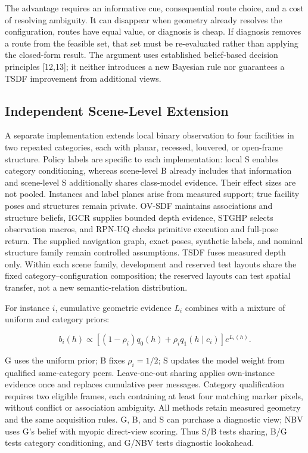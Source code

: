\documentclass[11pt,a4paper]{article}
\begin{document}
The advantage requires an informative cue, consequential route choice, and a cost of resolving ambiguity. It can disappear when geometry already resolves the configuration, routes have equal value, or diagnosis is cheap. If diagnosis removes a route from the feasible set, that set must be re-evaluated rather than applying the closed-form result. The argument uses established belief-based decision principles {[}12,13{]}; it neither introduces a new Bayesian rule nor guarantees a TSDF improvement from additional views.

\hypertarget{independent-scene-level-extension}{%
\subsection{Independent Scene-Level Extension}\label{independent-scene-level-extension}}

A separate implementation extends local binary observation to four facilities in two repeated categories, each with planar, recessed, louvered, or open-frame structure. Policy labels are specific to each implementation: local S enables category conditioning, whereas scene-level B already includes that information and scene-level S additionally shares class-model evidence. Their effect sizes are not pooled. Instances and label planes arise from measured support; true facility poses and structures remain private. OV-SDF maintains associations and structure beliefs, IGCR supplies bounded depth evidence, STGHP selects observation macros, and RPN-UQ checks primitive execution and full-pose return. The supplied navigation graph, exact poses, synthetic labels, and nominal structure family remain controlled assumptions. TSDF fuses measured depth only. Within each scene family, development and reserved test layouts share the fixed category--configuration composition; the reserved layouts can test spatial transfer, not a new semantic-relation distribution.

For instance \(i\), cumulative geometric evidence \(L_i\) combines with a mixture of uniform and category priors:

\[
b_i(h)\propto[(1-\rho_i)q_0(h)+\rho_iq_1(h\mid c_i)]e^{L_i(h)}.
\]

G uses the uniform prior; B fixes \(\rho_i=1/2\); S updates the model weight from qualified same-category peers. Leave-one-out sharing applies own-instance evidence once and replaces cumulative peer messages. Category qualification requires two eligible frames, each containing at least four matching marker pixels, without conflict or association ambiguity. All methods retain measured geometry and the same acquisition rules. G, B, and S can purchase a diagnostic view; NBV uses G's belief with myopic direct-view scoring. Thus S/B tests sharing, B/G tests category conditioning, and G/NBV tests diagnostic lookahead.
\end{document}
